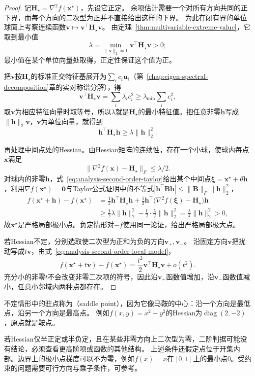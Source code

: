 \begin{proof}
记$\bm H_\star=\nabla^2f(\bm{x}^{\star})$，先设它正定。
余项估计需要一个对所有方向共同的正下界，而每个方向的二次型为正并不直接给出这样的下界。
为此在闭有界的单位球面上考察连续函数$\bm v\mapsto\bm v^\top\bm H_\star\bm v$。
由定理~\ref{thm:multivariable-extreme-value}，它取到最小值
\[
 \lambda=\min_{\lVert\bm v\rVert_2=1}\bm v^\top\bm H_\star\bm v>0;
\]
最小值在某个单位向量处取得，正定性保证这个值为正。

把$\bm v$按$\bm H_\star$的标准正交特征基展开为$\sum_ic_i\bm u_i$（第~\ref{chap:eigen-spectral-decomposition}章的实对称谱分解），得
\[
 \bm v^\top\bm H_\star\bm v=\sum_i\lambda_ic_i^2\geq\lambda_{\min}\sum_ic_i^2,
\]
取$\bm v$为相应特征向量时取等号，所以$\lambda$就是$\bm H_\star$的最小特征值。把任意非零$\bm h$写成$\lVert\bm h\rVert_2\bm v$，$\bm v$为单位向量，就得到
\[
 \bm h^\top\bm H_\star\bm h\geq\lambda\lVert\bm h\rVert_2^2.
\]

再处理中间点处的Hessian。由Hessian矩阵的连续性，存在一个小球，使球内每点$\bm x$满足
\[
 \lVert\nabla^2f(\bm x)-\bm H_\star\rVert_F\leq\lambda/2.
\]
对球内的非零$\bm h$，式~\eqref{eq:analysis-second-order-taylor}给出某个中间点$\bm\xi=\bm x^\star+\theta\bm h$，利用$\nabla f(\bm x^\star)=\bm 0$与Taylor公式证明中的不等式$|\bm h^\top\bm B\bm h|\leq\lVert\bm B\rVert_F\lVert\bm h\rVert_2^2$，
\[
 \begin{aligned}
 f(\bm{x}^{\star}+\bm{h})-f(\bm{x}^{\star})
 &=\frac12\bm h^\top\bm H_\star\bm h+\frac12\bm h^\top\bigl(\nabla^2f(\bm\xi)-\bm H_\star\bigr)\bm h\\
 &\geq\frac12\lambda\lVert\bm h\rVert_2^2-\frac12\cdot\frac{\lambda}{2}\lVert\bm h\rVert_2^2
 =\frac{\lambda}{4}\lVert\bm{h}\rVert_2^2>0,
 \end{aligned}
\]
故$\bm{x}^{\star}$是严格局部极小点。负定情形对$-f$使用同一论证，给出严格局部极大点。

若Hessian不定，分别选取使二次型为正和为负的方向$\bm v_+,\bm v_-$。
沿固定方向$\bm v$把扰动写成$t\bm v$，由式~\eqref{eq:analysis-second-order-local-model}，
\[
 f(\bm x^\star+t\bm v)-f(\bm x^\star)=\frac{t^2}{2}\bm v^\top\bm H_\star\bm v+o(t^2).
\]
充分小的非零$t$不会改变非零二次项的符号，因此沿$\bm v_+$函数值增加，沿$\bm v_-$函数值减小，任意小邻域内两种点都存在。
\end{proof}
不定情形中的驻点称为（saddle point），因为它像马鞍的中心：沿一个方向是最低点，沿另一个方向是最高点。
例如$f(x,y)=x^2-y^2$的Hessian为$\operatorname{diag}(2,-2)$，原点就是鞍点。

若Hessian仅半正定或半负定，且在某些非零方向上二次型为零，二阶判据可能没有结论，必须查看更高阶项或函数的其他结构。
上述条件还假定点位于开集内部。边界上的极小点梯度可以不为零，例如$f(x)=x$在$[0,1]$上的最小点$0$。受约束的问题需要可行方向与乘子条件，可参考。

